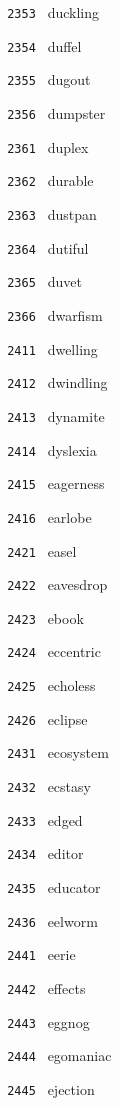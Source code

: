 \documentclass[11pt]{article}
\begin{document}
\begin{multicols}{6}
\noindent \texttt{ 2353 } duckling  \par
\noindent \texttt{ 2354 } duffel  \par
\noindent \texttt{ 2355 } dugout  \par
\noindent \texttt{ 2356 } dumpster  \par
\noindent \texttt{ 2361 } duplex  \par
\noindent \texttt{ 2362 } durable  \par
\noindent \texttt{ 2363 } dustpan  \par
\noindent \texttt{ 2364 } dutiful  \par
\noindent \texttt{ 2365 } duvet  \par
\noindent \texttt{ 2366 } dwarfism  \par
\noindent \texttt{ 2411 } dwelling  \par
\noindent \texttt{ 2412 } dwindling  \par
\noindent \texttt{ 2413 } dynamite  \par
\noindent \texttt{ 2414 } dyslexia  \par
\noindent \texttt{ 2415 } eagerness  \par
\noindent \texttt{ 2416 } earlobe  \par
\noindent \texttt{ 2421 } easel  \par
\noindent \texttt{ 2422 } eavesdrop  \par
\noindent \texttt{ 2423 } ebook  \par
\noindent \texttt{ 2424 } eccentric  \par
\noindent \texttt{ 2425 } echoless  \par
\noindent \texttt{ 2426 } eclipse  \par
\noindent \texttt{ 2431 } ecosystem  \par
\noindent \texttt{ 2432 } ecstasy  \par
\noindent \texttt{ 2433 } edged  \par
\noindent \texttt{ 2434 } editor  \par
\noindent \texttt{ 2435 } educator  \par
\noindent \texttt{ 2436 } eelworm  \par
\noindent \texttt{ 2441 } eerie  \par
\noindent \texttt{ 2442 } effects  \par
\noindent \texttt{ 2443 } eggnog  \par
\noindent \texttt{ 2444 } egomaniac  \par
\noindent \texttt{ 2445 } ejection  \par

\end{multicols}
\end{document}
